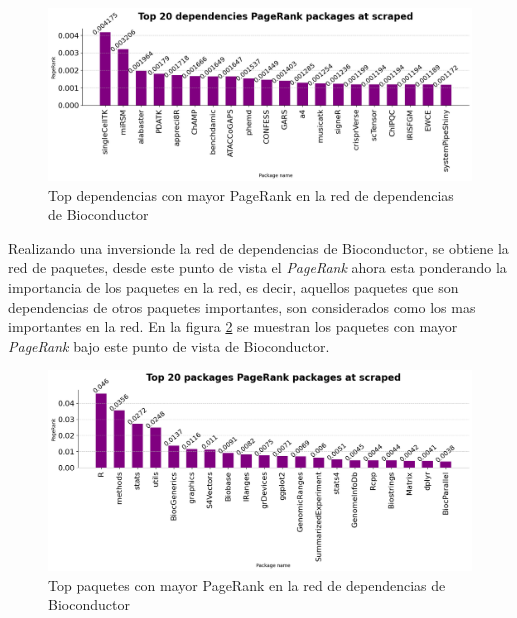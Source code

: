 \begin{figure}[h!]
    \begin{center}
        \includegraphics[width=1\textwidth]{img/bioconductor/top_pagerrank_dependencies.png}
        \caption{Top dependencias con mayor PageRank en la red de dependencias de Bioconductor}
        \label{fig:bioconductor_top_pagerank_dependencies}
    \end{center}
\end{figure}

Realizando una inversionde la red de dependencias de Bioconductor, se obtiene la red de paquetes, desde este punto de vista
el \textit{PageRank} ahora esta ponderando la importancia de los paquetes en la red, es decir, aquellos paquetes que son dependencias
de otros paquetes importantes, son considerados como los mas importantes en la red. En la figura \ref{fig:bioconductor_top_pagerank_packages}
se muestran los paquetes con mayor \textit{PageRank} bajo este punto de vista de Bioconductor.

\begin{figure}[h!]
    \begin{center}
        \includegraphics[width=1\textwidth]{img/bioconductor/top_pagerrank_packages.png}
        \caption{Top paquetes con mayor PageRank en la red de dependencias de Bioconductor}
        \label{fig:bioconductor_top_pagerank_packages}
    \end{center}
\end{figure}









